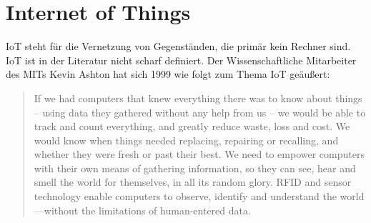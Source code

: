 \section{Internet of Things}
\ac{IoT} steht für die Vernetzung von Gegenständen, die primär kein Rechner sind. \ac{IoT} ist in der Literatur nicht scharf definiert. Der Wissenschaftliche Mitarbeiter des MITs Kevin Ashton hat sich 1999 wie folgt zum Thema \ac{IoT} geäußert: 
\begin{quote}
If we had computers that knew everything there was to know about things -- using data they gathered 
without any help from us -- we would be able to track and count everything, and greatly reduce waste, 
loss and cost. We would know when things needed replacing, repairing or recalling, and whether they 
were fresh or past their best. We need to empower computers with their own means of gathering 
information, so they can see, hear and smell the world for themselves, in all its random glory. RFID and 
sensor technology enable computers to observe, identify and understand the world—without the 
limitations of human-entered data.
\end{quote}

